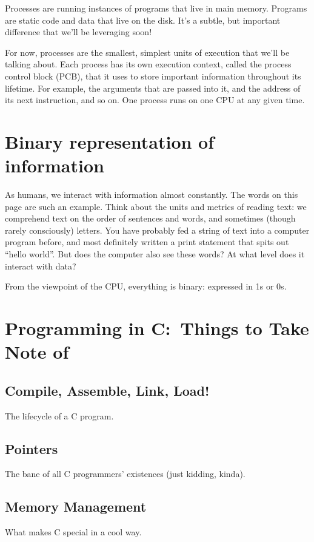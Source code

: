 \documentclass[fontsize=12pt,twoside=on,openright,parskip=half]{scrbook}
\begin{document}
Processes are running instances of programs that live in main memory. Programs
are static code and data that live on the disk. It’s a subtle, but important
difference that we’ll be leveraging soon!

For now, processes are the smallest, simplest units of execution that we’ll be
talking about. Each process has its own execution context, called the process
control block (PCB), that it uses to store important information throughout its
lifetime. For example, the arguments that are passed into it, and the address
of its next instruction, and so on. One process runs on one CPU at any given
time.

\section*{Binary representation of information}

As humans, we interact with information almost constantly. The words on this
page are such an example. Think about the units and metrics of reading text: we
comprehend text on the order of sentences and words, and sometimes (though
rarely consciously) letters. You have probably fed a string of text into a
computer program before, and most definitely written a print statement that
spits out “hello world”. But does the computer also see these words? At what
level does it interact with data?

From the viewpoint of the CPU, everything is binary: expressed in 1s or 0s.

\section*{Programming in C:\ Things to Take Note of}

\subsection*{Compile, Assemble, Link, Load!} 
The lifecycle of a C program.

\subsection*{Pointers}
The bane of all C programmers’ existences (just kidding, kinda).

\subsection*{Memory Management}
What makes C special in a cool way.
\end{document}

